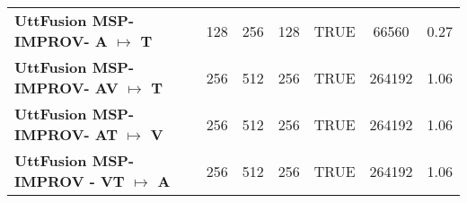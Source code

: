 \begin{table}[]
{\begin{tabular}{l|cccccc}
\textbf{UttFusion MSP-IMPROV- A $\mapsto$ T}   & 128                 & 256                  & 128                  & TRUE                & 66560                     & 0.27               \\
\textbf{UttFusion MSP-IMPROV- AV $\mapsto$ T}  & 256                 & 512                  & 256                  & TRUE                & 264192                    & 1.06               \\
\textbf{UttFusion MSP-IMPROV- AT $\mapsto$ V}  & 256                 & 512                  & 256                  & TRUE                & 264192                    & 1.06               \\
\textbf{UttFusion MSP-IMPROV - VT $\mapsto$ A} & 256                 & 512                  & 256                  & TRUE                & 264192                    & 1.06               \\ \hline
\end{tabular}%
}
\end{table}